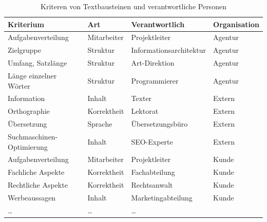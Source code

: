\begin{table}
\begin{center}
\begin{tabular}{@{}l l l l}
\textbf{Kriterium} & \textbf{Art} & \textbf{Verantwortlich} & \textbf{Organisation}\\
\hline
Aufgabenverteilung & Mitarbeiter & Projektleiter & Agentur\\
\hline
Zielgruppe & Struktur & Informationsarchitektur & Agentur\\
\hline
Umfang, Satzlänge & Struktur & Art-Direktion & Agentur\\
\hline
Länge einzelner Wörter & Struktur & Programmierer & Agentur\\
\hline
Information & Inhalt & Texter & Extern\\
\hline
Orthographie & Korrektheit & Lektorat & Extern\\
\hline
Übersetzung & Sprache & Übersetzungsbüro & Extern\\
\hline
Suchmaschinen-Optimierung & Inhalt & SEO-Experte & Extern\\
\hline
Aufgabenverteilung & Mitarbeiter & Projektleiter & Kunde\\
\hline
Fachliche Aspekte & Korrektheit & Fachabteilung & Kunde\\
\hline
Rechtliche Aspekte & Korrektheit & Rechtsanwalt & Kunde\\
\hline
Werbeaussagen & Inhalt & Marketingabteilung & Kunde\\
\hline
… & … & …
\end{tabular}
\caption{Kriteren von Textbausteinen und verantwortliche Personen}
\label{table:textkriterien}
\end{center}
\end{table}

